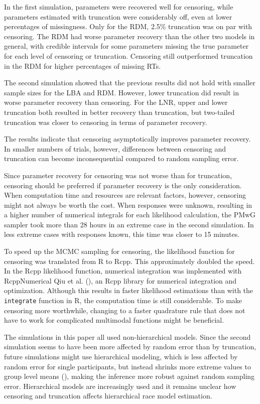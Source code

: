 \documentclass[
  stu,
  longtable,
  nolmodern,
  notxfonts,
  notimes,
  draftfirst,
  colorlinks=true,linkcolor=blue,citecolor=blue,urlcolor=blue]{apa7}
\begin{document}
In the first simulation, parameters were recovered well for censoring,
while parameters estimated with truncation were considerably off, even
at lower percentages of missingness. Only for the RDM, 2.5\% truncation
was on par with censoring. The RDM had worse parameter recovery than the
other two models in general, with credible intervals for some parameters
missing the true parameter for each level of censoring or truncation.
Censoring still outperformed truncation in the RDM for higher
percentages of missing RTs.

The second simulation showed that the previous results did not hold with
smaller sample sizes for the LBA and RDM. However, lower truncation did
result in worse parameter recovery than censoring. For the LNR, upper
and lower truncation both resulted in better recovery than truncation,
but two-tailed truncation was closer to censoring in terms of parameter
recovery.

The results indicate that censoring asymptotically improves parameter
recovery. In smaller numbers of trials, however, differences between
censoring and truncation can become inconsequential compared to random
sampling error.

Since parameter recovery for censoring was not worse than for
truncation, censoring should be preferred if parameter recovery is the
only consideration. When computation time and resources are relevant
factors, however, censoring might not always be worth the cost. When
responses were unknown, resulting in a higher number of numerical
integrals for each likelihood calculation, the PMwG sampler took more
than 28 hours in an extreme case in the second simulation. In less
extreme cases with responses known, this time was closer to 15 minutes.

To speed up the MCMC sampling for censoring, the likelihood function for
censoring was translated from R to Rcpp. This approximately doubled the
speed. In the Rcpp likelihood function, numerical integration was
implemented with RcppNumerical Qiu et al.
(), an Rcpp library for numerical
integration and optimization. Although this results in faster likelihood
estimations than with the \texttt{integrate} function in R, the
computation time is still considerable. To make censoring more
worthwhile, changing to a faster quadrature rule that does not have to
work for complicated multimodal functions might be beneficial.

The simulations in this paper all used non-hierarchical models. Since
the second simulation seems to have been more affected by random error
than by truncation, future simulations might use hierarchical modeling,
which is less affected by random error for single participants, but
instead shrinks more extreme values to group level means
(), making the inference
more robust against random sampling error. Hierarchical models are
increasingly used and it remains unclear how censoring and truncation
affects hierarchical race model estimation.
\end{document}
